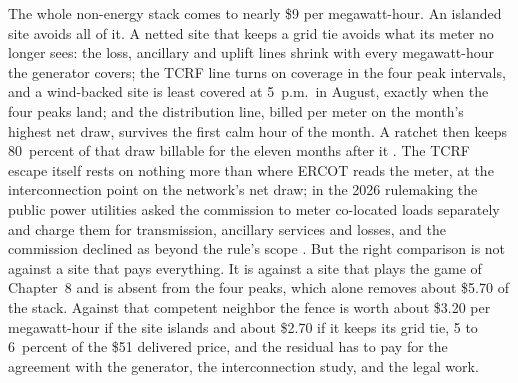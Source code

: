 The whole non-energy stack comes to nearly \$9 per megawatt-hour. An islanded site avoids all of it. A netted site that keeps a grid tie avoids what its meter no longer sees: the loss, ancillary and uplift lines shrink with every megawatt-hour the generator covers; the TCRF line turns on coverage in the four peak intervals, and a wind-backed site is least covered at 5~p.m.\ in August, exactly when the four peaks land; and the distribution line, billed per meter on the month's highest net draw, survives the first calm hour of the month. A ratchet then keeps 80~percent of that draw billable for the eleven months after it \autocite{oncor2026retailtariff}. The TCRF escape itself rests on nothing more than where ERCOT reads the meter, at the interconnection point on the network's net draw; in the 2026 rulemaking the public power utilities asked the commission to meter co-located loads separately and charge them for transmission, ancillary services and losses, and the commission declined as beyond the rule's scope \autocite{puct25205}. %
But the right comparison is not against a site that pays everything. It is against a site that plays the game of Chapter~8 and is absent from the four peaks, which alone removes about \$5.70 of the stack. Against that competent neighbor the fence is worth about \$3.20 per megawatt-hour if the site islands and about \$2.70 if it keeps its grid tie, 5 to 6~percent of the \$51 delivered price, and the residual has to pay for the agreement with the generator, the interconnection study, and the legal work. %

